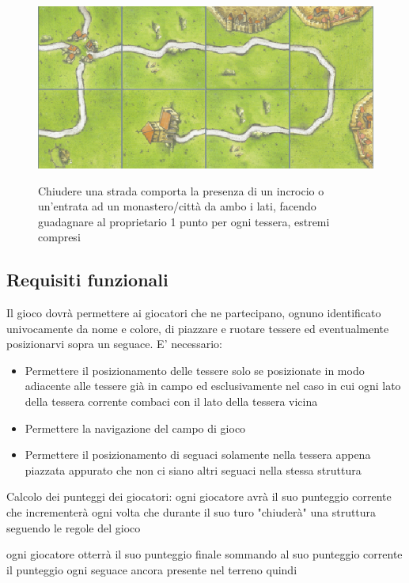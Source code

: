 \begin{figure}[]
    {\includegraphics[]{images/Strada.png}}

    \caption{Chiudere una strada comporta la presenza di un incrocio o un’entrata ad un monastero/città da ambo i lati, facendo guadagnare al proprietario 1 punto per ogni tessera, estremi compresi}
\end{figure}

\subsection*{Requisiti funzionali}
Il gioco dovrà permettere ai giocatori che ne partecipano, ognuno identificato univocamente da nome e colore, di piazzare e ruotare tessere ed eventualmente posizionarvi sopra un seguace. E' necessario:

\begin{itemize}
\item Permettere il posizionamento delle tessere solo se posizionate in modo adiacente alle tessere già in campo ed esclusivamente nel caso in cui ogni lato della tessera corrente combaci con il lato della tessera vicina
\item Permettere la navigazione del campo di gioco
\item Permettere il posizionamento di seguaci solamente nella tessera appena piazzata appurato che non ci siano altri seguaci nella stessa struttura
\end{itemize}

Calcolo dei punteggi dei giocatori: ogni giocatore avrà il suo punteggio corrente che incrementerà ogni volta che durante il suo turo "chiuderà" una struttura seguendo le regole del gioco

ogni giocatore otterrà il suo punteggio finale sommando al suo punteggio corrente il punteggio ogni seguace ancora presente nel terreno quindi


